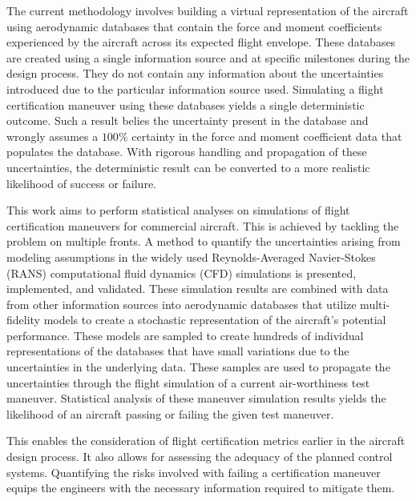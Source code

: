 The current methodology involves building a virtual representation of the aircraft using aerodynamic databases that contain the force and moment coefficients experienced by the aircraft across its expected flight envelope. 
These databases are created using a single information source and at specific milestones during the design process. 
They do not contain any information about the uncertainties introduced due to the particular information source used.
Simulating a flight certification maneuver using these databases yields a single deterministic outcome.
Such a result belies the uncertainty present in the database and wrongly assumes a $100\%$ certainty in the force and moment coefficient data that populates the database. 
With rigorous handling and propagation of these uncertainties, the deterministic result can be converted to a more realistic likelihood of success or failure.

This work aims to perform statistical analyses on simulations of flight certification maneuvers for commercial aircraft. 
This is achieved by tackling the problem on multiple fronts.
A method to quantify the uncertainties arising from modeling assumptions in the widely used Reynolds-Averaged Navier-Stokes (RANS) computational fluid dynamics (CFD) simulations is presented, implemented, and validated. 
These simulation results are combined with data from other information sources into aerodynamic databases that utilize multi-fidelity models to create a stochastic representation of the aircraft's potential performance.
These models are sampled to create hundreds of individual representations of the databases that have small variations due to the uncertainties in the underlying data. 
These samples are used to propagate the uncertainties through the flight simulation of a current air-worthiness test maneuver.
Statistical analysis of these maneuver simulation results yields the likelihood of an aircraft passing or failing the given test maneuver.

This enables the consideration of flight certification metrics earlier in the aircraft design process.
It also allows for assessing the adequacy of the planned control systems.
Quantifying the risks involved with failing a certification maneuver equips the engineers with the necessary information required to mitigate them.